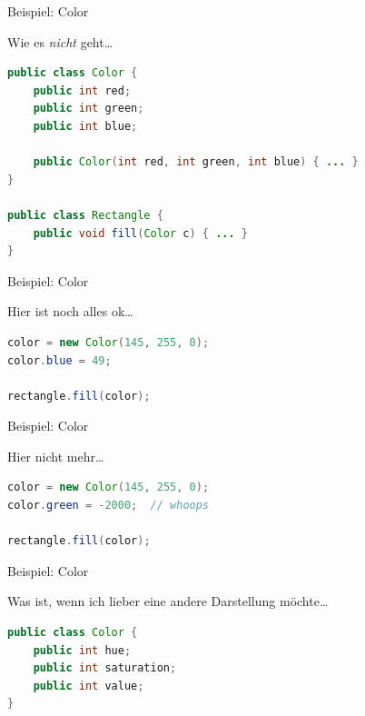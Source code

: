 \documentclass[18pt]{beamer}
\begin{document}
\begin{frame}[fragile]{Beispiel: Color}

    Wie es \textit{nicht} geht\dots

    \begin{exampleblock}{}
        \begin{lstlisting}[language=Java]
public class Color {
    public int red;
    public int green;
    public int blue;

    public Color(int red, int green, int blue) { ... }
}

public class Rectangle {
    public void fill(Color c) { ... }
}
        \end{lstlisting}

    \end{exampleblock}

\end{frame}

\begin{frame}[fragile]{Beispiel: Color}

    Hier ist noch alles ok\dots

    \begin{exampleblock}{}
        \begin{lstlisting}[language=Java]
color = new Color(145, 255, 0);
color.blue = 49;

rectangle.fill(color);
        \end{lstlisting}

    \end{exampleblock}

\end{frame}

\begin{frame}[fragile]{Beispiel: Color}

    Hier nicht mehr\dots

    \begin{exampleblock}{}
        \begin{lstlisting}[language=Java]
color = new Color(145, 255, 0);
color.green = -2000;  // whoops

rectangle.fill(color);
        \end{lstlisting}

    \end{exampleblock}

\end{frame}


\begin{frame}[fragile]{Beispiel: Color}

    Was ist, wenn ich lieber eine andere Darstellung möchte\dots

    \begin{exampleblock}{}
        \begin{lstlisting}[language=Java]
public class Color {
    public int hue;
    public int saturation;
    public int value;
}
        \end{lstlisting}

    \end{exampleblock}

\end{frame}
\end{document}
